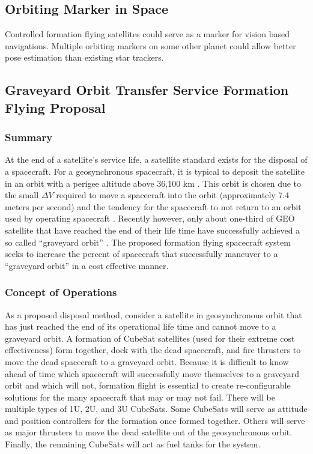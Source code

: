 \subsection{Orbiting Marker in Space}
Controlled formation flying satellites could serve as a marker for vision based navigations. Multiple orbiting markers on some other planet could allow better pose estimation than existing star trackers.

\subsection{Graveyard Orbit Transfer Service Formation Flying Proposal}
\subsubsection{Summary}
At the end of a satellite's service life, a satellite standard exists for the disposal of a spacecraft. For a geosynchronous spacecraft, it is typical to deposit the satellite in an orbit with a perigee altitude above 36,100 km \cite{standard}. This orbit is chosen due to the small $\Delta V$ required to move a spacecraft into the orbit (approximately 7.4 meters per second) and the tendency for the spacecraft to not return to an orbit used by operating spacecraft \cite {SMAD}. Recently however, only about one-third of GEO satellite that have reached the end of their life time have successfully achieved a so called ``graveyard orbit'' \cite{ESA}. The proposed formation flying spacecraft system seeks to increase the percent of spacecraft that successfully maneuver to a ``graveyard orbit'' in a cost effective manner. 

\subsubsection{Concept of Operations}
As a proposed disposal method, consider a satellite in geosynchronous orbit that has just reached the end of its operational life time and cannot move to a graveyard orbit. A formation of CubeSat satellites (used for their extreme cost effectiveness) form together, dock with the dead spacecraft, and fire thrusters to move the dead spacecraft to a graveyard orbit. Because it is difficult to know ahead of time which spacecraft will successfully move themselves to a graveyard orbit and which will not, formation flight is essential to create re-configurable solutions for the many spacecraft that may or may not fail. There will be multiple types of 1U, 2U, and 3U CubeSats. Some CubeSats will serve as attitude and position controllers for the formation once formed together. Others will serve as major thrusters to move the dead satellite out of the geosynchronous orbit. Finally, the remaining CubeSats will act as fuel tanks for the system.

